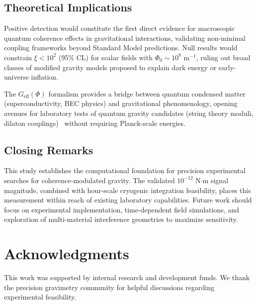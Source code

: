 \documentclass[10pt,twocolumn]{article}
\begin{document}
\subsection{Theoretical Implications}

Positive detection would constitute the first direct evidence for macroscopic quantum coherence effects in gravitational interactions, validating non-minimal coupling frameworks beyond Standard Model predictions. Null results would constrain $\xi < 10^2$ (95\% CL) for scalar fields with $\Phi_0 \sim 10^8$ m$^{-1}$, ruling out broad classes of modified gravity models proposed to explain dark energy or early-universe inflation.

The $G_{\text{eff}}(\Phi)$ formalism provides a bridge between quantum condensed matter (superconductivity, BEC physics) and gravitational phenomenology, opening avenues for laboratory tests of quantum gravity candidates (string theory moduli, dilaton couplings)~\cite{verlinde2011,jacobson1995} without requiring Planck-scale energies.

\subsection{Closing Remarks}

This study establishes the computational foundation for precision experimental searches for coherence-modulated gravity. The validated $10^{-12}$ N$\cdot$m signal magnitude, combined with hour-scale cryogenic integration feasibility, places this measurement within reach of existing laboratory capabilities. Future work should focus on experimental implementation, time-dependent field simulations, and exploration of multi-material interference geometries to maximize sensitivity.

\section{Acknowledgments}

This work was supported by internal research and development funds. We thank the precision gravimetry community for helpful discussions regarding experimental feasibility.



\end{document}
